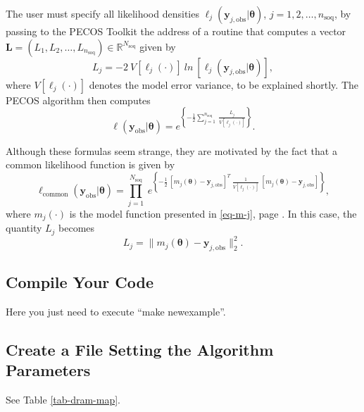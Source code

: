 The user must specify all likelihood densities $\ell_j(\mathbf{y}_{j,\text{obs}}|\boldsymbol{\theta})$, $j=1,2,\ldots,n_{\text{soq}}$,
by passing to the PECOS Toolkit the address of a routine that computes a vector $\mathbf{L}=(L_1,L_2,\ldots,L_{n_{\text{soq}}})\in\mathbb{R}^{N_{\text{soq}}}$  given by
\begin{equation}\label{eq-m2l-likelihood}
L_j = -2~V[\ell_j(\cdot)]~ln~
\left[
\ell_j(\mathbf{y}_{j,\text{obs}}|\boldsymbol{\theta})
\right],
\end{equation}
where
$V[\ell_j(\cdot)]$ denotes the model error variance, to be explained shortly.
The PECOS algorithm then computes
\begin{equation*}
\ell(\mathbf{y}_{\text{obs}}|\boldsymbol{\theta}) = e^
{
\left\{
-\frac{1}{2}\sum_{j=1}^{n_{\text{soq}}}~\frac{L_j}{V[\ell_j(\cdot)]}
\right\}
}.
\end{equation*}

Although these formulas seem strange, they are motivated by the fact that a common likelihood function is given by
\begin{equation*}
\ell_{\text{common}}(\mathbf{y}_{\text{obs}}|\boldsymbol{\theta}) =
\prod_{j=1}^{N_{\text{soq}}}~
e^
{
\left\{
-\frac{1}{2}~[m_j(\boldsymbol{\theta})-\mathbf{y}_{j,\text{obs}}]^T~\frac{1}{V[\ell_j(\cdot)]}~[m_j(\boldsymbol{\theta})-\mathbf{y}_{j,\text{obs}}]
\right\}
},
\end{equation*}
where
$m_j(\cdot)$ is the model function presented in \eqref{eq-m-j}, page \pageref{eq-m-j}.
In this case, the quantity $L_j$ becomes
\begin{equation}\label{eq-m2l-likelihood-2}
L_j = \|m_j(\boldsymbol{\theta})-\mathbf{y}_{j,\text{obs}}\|_2^2.
\end{equation}

\subsection{Compile Your Code}\label{subsc-gmc-eight-steps-compile}

Here you just need to execute ``make newexample''.

\subsection{Create a File Setting the Algorithm Parameters}\label{subsc-gmc-eight-steps-alg-params}

See Table \ref{tab-dram-map}.

